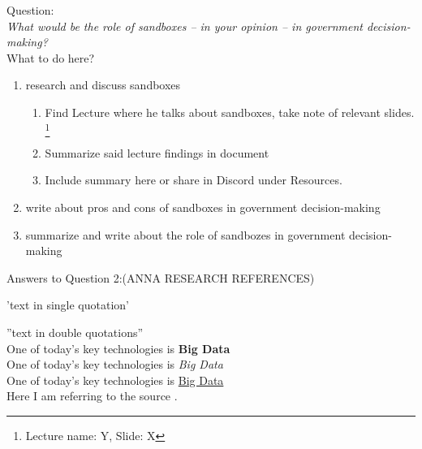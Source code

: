 Question:\\
\emph{
    What would be the role of sandboxes – in your opinion – in government decision-making?
}\\

What to do here?
\begin{enumerate}
    \item research and discuss sandboxes
    \begin{enumerate}
    \item Find Lecture where he talks about sandboxes, take note of relevant slides.
    \footnote{Lecture name: Y, Slide: X}
    \item Summarize said lecture findings in document
    \item Include summary here or share in Discord under Resources.
    \end{enumerate}
    \item write about pros and cons of sandboxes in government decision-making
    \item summarize and write about the role of sandbozes in government decision-making
  \end{enumerate}

\newpage Answers to Question 2:(ANNA RESEARCH REFERENCES)

\newpage 
'text in single quotation'

''text in double quotations''\\

One of today’s key technologies is \textbf{Big Data}\\
One of today’s key technologies is \textit{Big Data}\\
One of today’s key technologies is \underline{Big Data}\\

Here I am referring to the source \cite{BigData}.